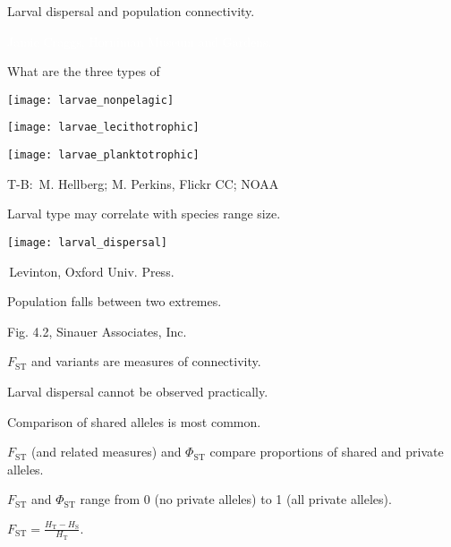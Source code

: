 \documentclass[t]{beamer}
\begin{document}

{
\begin{frame}[b]{Larval dispersal and population connectivity.}

	\hfill \tiny \textcolor{white}{Jamie Craggs, Horniman Museum and Gardens.}
\end{frame}
}
%
\begin{frame}[t]{What are the three types of }
	\begin{multicols}{2}

	\begin{center}
		\texttt{[image: larvae\_nonpelagic]}
		
		\texttt{[image: larvae\_lecithotrophic]}

		\texttt{[image: larvae\_planktotrophic]}
	\end{center}	
	\columnbreak

	
	\end{multicols}
	
	\vfilll
	
	\tiny T-B: \textcopyright\,M. Hellberg; M. Perkins, Flickr CC; NOAA
\end{frame}
%
\begin{frame}[t]{Larval type may correlate with species range size.}

\texttt{[image: larval\_dispersal]}

\vfilll

\tiny \textcopyright\,Levinton, Oxford Univ. Press.
\end{frame}
%
{
\begin{frame}[b]{Population  falls between two extremes.}

	\hfill \tiny Fig. 4.2, \textcopyright Sinauer Associates, Inc.
\end{frame}
}
%
\begin{frame}{$F_\mathrm{ST}$ and variants are measures of connectivity.}

	\hangpara Larval dispersal cannot be observed practically.

	\hangpara Comparison of shared alleles is most common.

	\hangpara $F_{\mathrm{ST}}$ (and related measures) and $\Phi_{\mathrm{ST}}$ compare proportions of shared and private alleles.

	\hangpara $F_{\mathrm{ST}}$ and $\Phi_{\mathrm{ST}}$ range from 0 (no private alleles) to 1 (all private alleles).

	\hangpara $F_{\mathrm{ST}} = \frac{H_\mathrm{T} - H_\mathrm{S}}{H_\mathrm{T}}.$
	

\end{frame}
%
\end{document}
